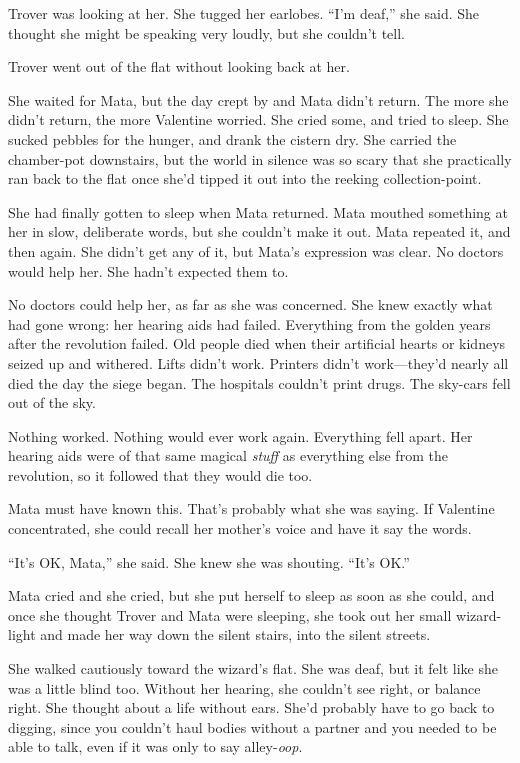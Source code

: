 Trover was looking at her. She tugged her earlobes. “I’m deaf,” she
said. She thought she might be speaking very loudly, but she
couldn’t tell.

Trover went out of the flat without looking back at her.

She waited for Mata, but the day crept by and Mata didn’t return.
The more she didn’t return, the more Valentine worried. She cried
some, and tried to sleep. She sucked pebbles for the hunger, and
drank the cistern dry. She carried the chamber-pot downstairs, but
the world in silence was so scary that she practically ran back to
the flat once she’d tipped it out into the reeking
collection-point.

She had finally gotten to sleep when Mata returned. Mata mouthed
something at her in slow, deliberate words, but she couldn’t make
it out. Mata repeated it, and then again. She didn’t get any of it,
but Mata’s expression was clear. No doctors would help her. She
hadn’t expected them to.

No doctors could help her, as far as she was concerned. She knew
exactly what had gone wrong: her hearing aids had failed.
Everything from the golden years after the revolution failed. Old
people died when their artificial hearts or kidneys seized up and
withered. Lifts didn’t work. Printers didn’t work—they’d nearly all
died the day the siege began. The hospitals couldn’t print drugs.
The sky-cars fell out of the sky.

Nothing worked. Nothing would ever work again. Everything fell
apart. Her hearing aids were of that same magical \emph{stuff} as
everything else from the revolution, so it followed that they would
die too.

Mata must have known this. That’s probably what she was saying. If
Valentine concentrated, she could recall her mother’s voice and
have it say the words.

“It’s OK, Mata,” she said. She knew she was shouting. “It’s OK.”

Mata cried and she cried, but she put herself to sleep as soon as
she could, and once she thought Trover and Mata were sleeping, she
took out her small wizard-light and made her way down the silent
stairs, into the silent streets.

She walked cautiously toward the wizard’s flat. She was deaf, but
it felt like she was a little blind too. Without her hearing, she
couldn’t see right, or balance right. She thought about a life
without ears. She’d probably have to go back to digging, since you
couldn’t haul bodies without a partner and you needed to be able to
talk, even if it was only to say alley-\emph{oop}.

